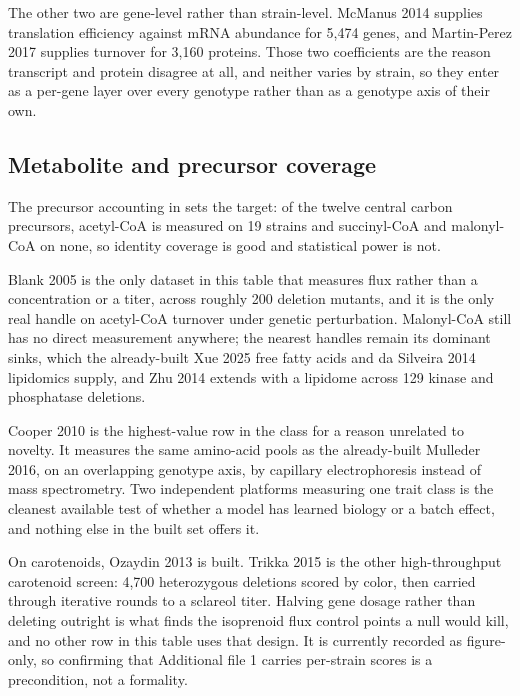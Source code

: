 The other two are gene-level rather than strain-level. McManus 2014 supplies translation
efficiency against mRNA abundance for 5,474 genes, and Martin-Perez 2017 supplies turnover
for 3,160 proteins. Those two coefficients are the reason transcript and protein disagree
at all, and neither varies by strain, so they enter as a per-gene layer over every genotype
rather than as a genotype axis of their own.

\subsection{Metabolite and precursor coverage}\label{sec:precursors}

The precursor accounting in
 sets the target: of the twelve central
carbon precursors, acetyl-CoA is measured on 19 strains and succinyl-CoA and malonyl-CoA on
none, so identity coverage is good and statistical power is not.

Blank 2005 is the only dataset in this table that measures flux rather than a
concentration or a titer, across roughly 200 deletion mutants, and it is the only real
handle on acetyl-CoA turnover under genetic perturbation. Malonyl-CoA still has no direct
measurement anywhere; the nearest handles remain its dominant sinks, which the already-built
Xue 2025 free fatty acids and da Silveira 2014 lipidomics supply, and Zhu 2014
extends with a lipidome across 129 kinase and phosphatase deletions.

Cooper 2010 is the highest-value row in the class for a reason unrelated to
novelty. It measures the same amino-acid pools as the already-built Mulleder 2016, on an
overlapping genotype axis, by capillary electrophoresis instead of mass spectrometry. Two
independent platforms measuring one trait class is the cleanest available test of whether a
model has learned biology or a batch effect, and nothing else in the built set offers it.

On carotenoids, Ozaydin 2013 is built. Trikka 2015 is the other high-throughput
carotenoid screen: 4,700 heterozygous deletions scored by color, then carried through
iterative rounds to a sclareol titer. Halving gene dosage rather than deleting outright is
what finds the isoprenoid flux control points a null would kill, and no other row in this
table uses that design. It is currently recorded as figure-only, so confirming that
Additional file 1 carries per-strain scores is a precondition, not a formality.

